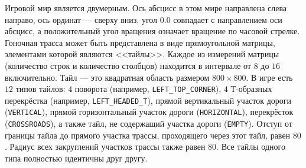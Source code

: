 Игровой мир является двумерным. Ось абсцисс в этом мире направлена слева направо, ось ординат --- сверху вниз, угол $0.0$ совпадает с
направлением оси абсцисс, а положительный угол вращения означает вращение по часовой стрелке. Гоночная трасса может быть представлена в виде
прямоугольной матрицы, элементами которой являются <<тайлы>>. Каждое из измерений матрицы (количество строк и количество столбцов) находится
в интервале от $8$ до $16$ включительно. Тайл --- это квадратная область размером $800\times800$. В игре есть $12$ типов тайлов: $4$
поворота (например, \texttt{LEFT\_TOP\_CORNER}), $4$ Т-образных перекрёстка (например, \texttt{LEFT\_HEADED\_T}), прямой вертикальный
участок дороги (\texttt{VERTICAL}), прямой горизонтальный участок дороги (\texttt{HORIZONTAL}), перекрёсток (\texttt{CROSSROADS}), а также
тайл, не содержащий участка дороги (\texttt{EMPTY}). Отступ от границы тайла до прямого участка трассы, проходящего через этот тайл, равен
$80$. Радиус всех закруглений участков трассы также равен $80$. Все тайлы одного типа полностью идентичны друг другу.

